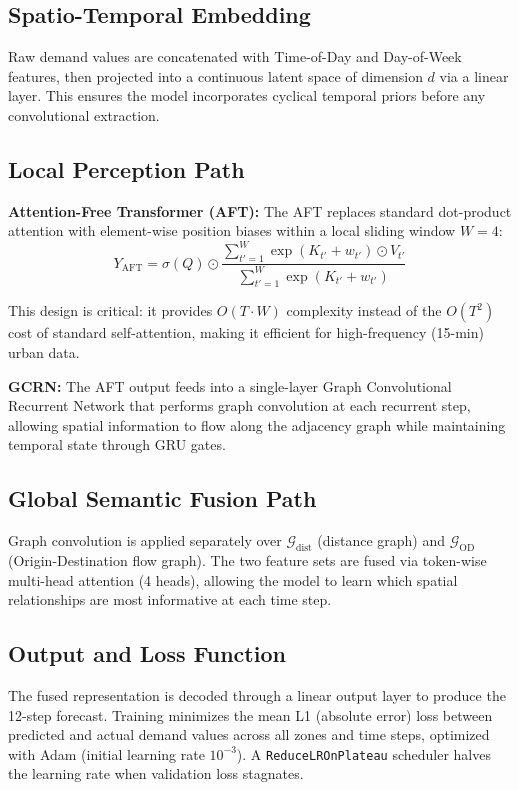 \documentclass{rapportECL}
\begin{document}
\subsection{Spatio-Temporal Embedding}
Raw demand values are concatenated with Time-of-Day and Day-of-Week features, then projected into a continuous latent space of dimension $d$ via a linear layer. This ensures the model incorporates cyclical temporal priors before any convolutional extraction.

\subsection{Local Perception Path}
\textbf{Attention-Free Transformer (AFT):} The AFT replaces standard dot-product attention with element-wise position biases within a local sliding window $W{=}4$:
\begin{equation}
Y_{\text{AFT}} = \sigma(Q) \odot \frac{\sum_{t'=1}^{W} \exp(K_{t'} + w_{t'}) \odot V_{t'}}{\sum_{t'=1}^{W} \exp(K_{t'} + w_{t'})}
\end{equation}

This design is critical: it provides $O(T \cdot W)$ complexity instead of the $O(T^2)$ cost of standard self-attention, making it efficient for high-frequency (15-min) urban data.

\textbf{GCRN:} The AFT output feeds into a single-layer Graph Convolutional Recurrent Network that performs graph convolution at each recurrent step, allowing spatial information to flow along the adjacency graph while maintaining temporal state through GRU gates.

\subsection{Global Semantic Fusion Path}
Graph convolution is applied separately over $\mathcal{G}_{\text{dist}}$ (distance graph) and $\mathcal{G}_{\text{OD}}$ (Origin-Destination flow graph). The two feature sets are fused via token-wise multi-head attention (4 heads), allowing the model to learn which spatial relationships are most informative at each time step.

\subsection{Output and Loss Function}
The fused representation is decoded through a linear output layer to produce the 12-step forecast. Training minimizes the mean L1 (absolute error) loss between predicted and actual demand values across all zones and time steps, optimized with Adam (initial learning rate $10^{-3}$). A \texttt{ReduceLROnPlateau} scheduler halves the learning rate when validation loss stagnates.
\end{document}
